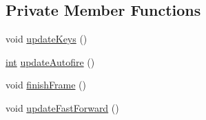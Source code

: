 \subsection*{Private Member Functions}
\begin{DoxyCompactItemize}
\item 
void \mbox{\hyperlink{class_q_g_b_a_1_1_core_controller_a1148fb5411b200cf1c5f67bfc7055eab}{update\+Keys}} ()
\item 
\mbox{\hyperlink{ioapi_8h_a787fa3cf048117ba7123753c1e74fcd6}{int}} \mbox{\hyperlink{class_q_g_b_a_1_1_core_controller_a6c4ad6bbaba7a1d1e8aca2f29a135633}{update\+Autofire}} ()
\item 
void \mbox{\hyperlink{class_q_g_b_a_1_1_core_controller_a6cce655789c611379527dafbd9726109}{finish\+Frame}} ()
\item 
void \mbox{\hyperlink{class_q_g_b_a_1_1_core_controller_a074cf60b510439d4e813c60f34829334}{update\+Fast\+Forward}} ()
\end{DoxyCompactItemize}
